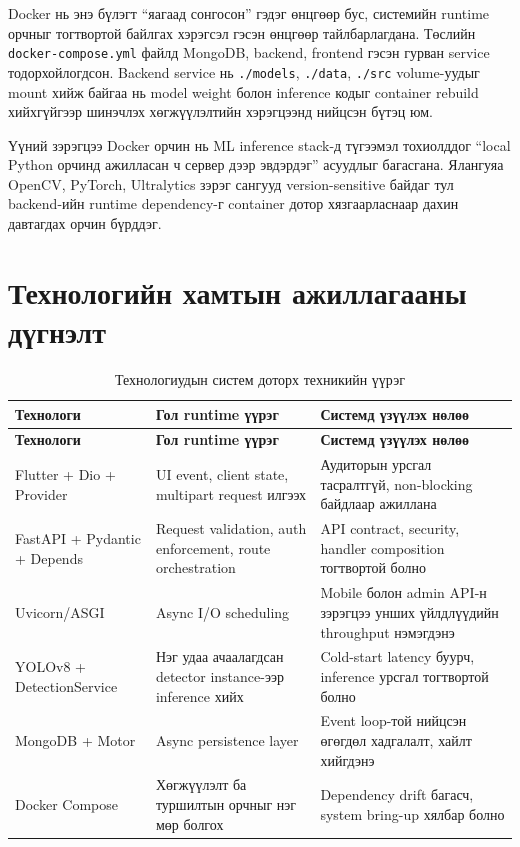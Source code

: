 Docker нь энэ бүлэгт ``яагаад сонгосон'' гэдэг өнцгөөр бус, системийн runtime орчныг тогтвортой байлгах хэрэгсэл гэсэн өнцгөөр тайлбарлагдана. Төслийн \texttt{docker-compose.yml} файлд MongoDB, backend, frontend гэсэн гурван service тодорхойлогдсон. Backend service нь \texttt{./models}, \texttt{./data}, \texttt{./src} volume-уудыг mount хийж байгаа нь model weight болон inference кодыг container rebuild хийхгүйгээр шинэчлэх хөгжүүлэлтийн хэрэгцээнд нийцсэн бүтэц юм.

Үүний зэрэгцээ Docker орчин нь ML inference stack-д түгээмэл тохиолддог ``local Python орчинд ажилласан ч сервер дээр эвдэрдэг'' асуудлыг багасгана. Ялангуяа OpenCV, PyTorch, Ultralytics зэрэг сангууд version-sensitive байдаг тул backend-ийн runtime dependency-г container дотор хязгаарласнаар дахин давтагдах орчин бүрддэг.

\section{Технологийн хамтын ажиллагааны дүгнэлт}

\begin{longtable}{|p{3cm}|p{3.2cm}|p{6.3cm}|}
\caption{Технологиудын систем доторх техникийн үүрэг}
\label{tab:tech_runtime_summary} \\
\hline
\textbf{Технологи} & \textbf{Гол runtime үүрэг} & \textbf{Системд үзүүлэх нөлөө} \\
\hline
\endfirsthead
\hline
\textbf{Технологи} & \textbf{Гол runtime үүрэг} & \textbf{Системд үзүүлэх нөлөө} \\
\hline
\endhead
\hline
\endfoot
Flutter + Dio + Provider & UI event, client state, multipart request илгээх & Аудиторын урсгал тасралтгүй, non-blocking байдлаар ажиллана \\
\hline
FastAPI + Pydantic + Depends & Request validation, auth enforcement, route orchestration & API contract, security, handler composition тогтвортой болно \\
\hline
Uvicorn/ASGI & Async I/O scheduling & Mobile болон admin API-н зэрэгцээ унших үйлдлүүдийн throughput нэмэгдэнэ \\
\hline
YOLOv8 + DetectionService & Нэг удаа ачаалагдсан detector instance-ээр inference хийх & Cold-start latency буурч, inference урсгал тогтвортой болно \\
\hline
MongoDB + Motor & Async persistence layer & Event loop-той нийцсэн өгөгдөл хадгалалт, хайлт хийгдэнэ \\
\hline
Docker Compose & Хөгжүүлэлт ба туршилтын орчныг нэг мөр болгох & Dependency drift багасч, system bring-up хялбар болно \\
\hline
\end{longtable}
